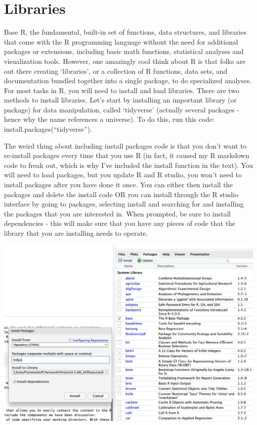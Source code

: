 \documentclass[
]{book}
\begin{document}
\hypertarget{libraries}{%
\section{Libraries}\label{libraries}}

Base R, the fundamental, built-in set of functions, data structures, and libraries that come with the R programming language without the need for additional packages or extensions, including basic math functions, statistical analyses and visualization tools. However, one amazingly cool think about R is that folks are out there creating `libraries', or a collection of R functions, data sets, and documentation bundled together into a single package, to do specialized analyses. For most tasks in R, you will need to install and load libraries. There are two methods to install libraries. Let's start by installing an important library (or package) for data manipulation, called `tidyverse' (actually several packages - hence why the name references a universe). To do this, run this code: install.packages(``tidyverse'').

The weird thing about including install packages code is that you don't want to re-install packages every time that you use R (in fact, it caused my R markdown code to freak out, which is why I've included the install function in the text). You will need to load packages, but you update R and R studio, you won't need to install packages after you have done it once. You can either then install the packages and delete the install code OR you can install through the R studio interface by going to packages, selecting install and searching for and installing the packages that you are interested in. When prompted, be sure to install dependencies - this will make sure that you have any pieces of code that the library that you are installing needs to operate.

\includegraphics{images:/01-intro/installlibraries.png}
\end{document}
